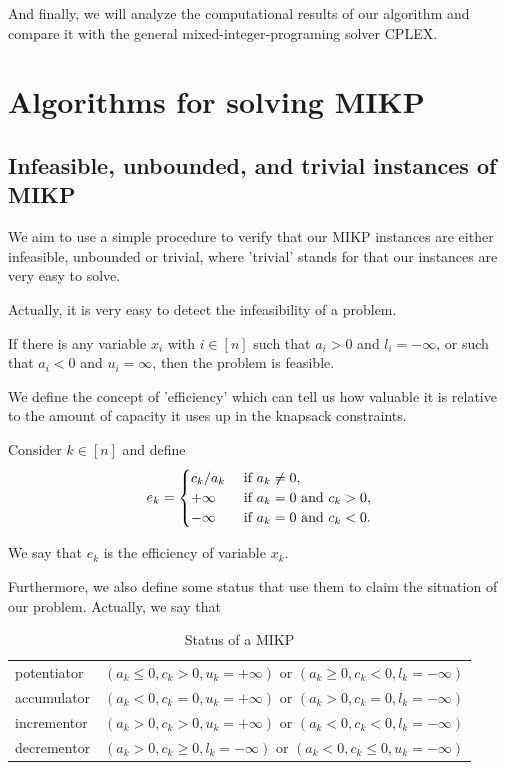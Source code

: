 \documentclass[a4paper,11pt]{article}
\begin{document}
And finally, we will analyze the computational results of our algorithm and compare it with the general mixed-integer-programing solver CPLEX.

\section{Algorithms for solving MIKP}

\subsection{Infeasible, unbounded, and trivial instances of MIKP}

We aim to use a simple procedure to verify that our MIKP instances are either infeasible, unbounded or trivial, where 'trivial' stands for that our instances are very easy to solve.

Actually, it is very easy to detect the infeasibility of a problem.
\begin{lemma}
 If there is any variable $x_i$ with $i \in [n]$ such that $a_i > 0$ and $l_i = −\infty$, or such that $a_i < 0$ and $u_i = \infty$, then the problem is feasible. 
\end{lemma}

We define the concept of 'efficiency' which can tell us how valuable it is relative to the amount of capacity it uses up in the knapsack constraints.

\begin{definition}
Consider $k\in [n]$ and define
\begin{equation}
e_k=\begin{cases}
c_k/a_k &~\mbox{if}~ a_k \neq 0,\\
+\infty &~\mbox{if}~ a_k=0 ~\mbox{and}~ c_k>0,\\
-\infty&~\mbox{if}~ a_k=0 ~\mbox{and}~ c_k<0.\\
\end{cases}
\end{equation}

We say that $e_k$ is the efficiency of variable $x_k$.
\end{definition}

Furthermore, we also define some status that use them to claim the situation of our problem. Actually, we say that
\begin{table}
\begin{center}
\begin{tabular}{l | c}
potentiator & $(a_k\leq 0, c_k>0, u_k=+\infty)$ or $(a_k\geq 0, c_k<0, l_k=-\infty)$\\
accumulator & $(a_k< 0, c_k=0, u_k=+\infty)$ or $(a_k> 0, c_k=0, l_k=-\infty)$\\
incrementor & $(a_k> 0, c_k>0, u_k=+\infty)$ or $(a_k<0, c_k<0, l_k=-\infty)$\\
decrementor & $(a_k> 0, c_k\geq 0, l_k=-\infty)$ or $(a_k<0, c_k\leq 0, u_k=-\infty)$
\end{tabular}
\end{center}
\caption{Status of a MIKP}
\end{table}
\end{document}
